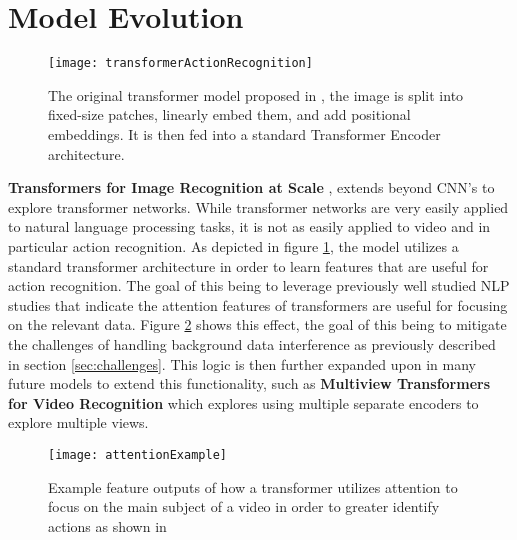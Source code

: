 \section{Model Evolution}

\begin{figure}[h]
	\texttt{[image: transformerActionRecognition]}
	\centering
	\caption{The original transformer model proposed in \cite{transformer_og}, the image is split into fixed-size patches, linearly embed them, and add positional embeddings. It is then fed into a standard Transformer Encoder architecture.}
	\label{fig:transformerActionRecognition}
\end{figure}

\textbf{Transformers for Image Recognition at Scale} \cite{transformer_og}, extends beyond CNN's to explore transformer networks. While transformer networks are very easily applied to natural language processing tasks, it is not as easily applied to video and in particular action recognition. As depicted in figure \ref{fig:transformerActionRecognition}, the model utilizes a standard transformer architecture in order to learn features that are useful for action recognition. The goal of this being to leverage previously well studied NLP studies that indicate the attention features of transformers are useful for focusing on the relevant data. Figure \ref{fig:attentionExample} shows this effect, the goal of this being to mitigate the challenges of handling background data interference as previously described in section \ref{sec:challenges}. This logic is then further expanded upon in many future models to extend this functionality, such as \textbf{Multiview Transformers for Video Recognition} \cite{multiview_transformers} which explores using multiple separate encoders to explore multiple views.

\begin{figure}[h]
	\texttt{[image: attentionExample]}
	\centering
	\caption{Example feature outputs of how a transformer utilizes attention to focus on the main subject of a video in order to greater identify actions as shown in \cite{transformer_og}}
	\label{fig:attentionExample}
\end{figure}

